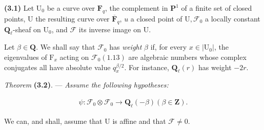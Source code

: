 \documentclass[10pt,leqno]{article}
\begin{document}
\noindent \textbf{(3.1)} Let \(\mathrm{U}_{0}\) be a curve over \(\mathbf{F}_{q}\), the complement in \(\mathbf{P}^{1}\) of a finite set of closed points, \(\mathrm{U}\) the resulting curve over \(\overline{\mathbf{F}}_{q}\), \(u\) a closed point of \(\mathrm{U}, \mathcal{F} _{0}\) a locally constant \(\mathbf{Q}_{\ell }\)-sheaf on \(\mathrm{U}_{0}\), and \(\mathcal{F} \) its inverse image on \(\mathrm{U}\).\par

\clearpage

\label{physical-13}

\noindent Let \(\beta \in \mathbf{Q}\). We shall say that \(\mathcal{F} _{0}\) has \emph{weight} \(\beta \) if, for every \(x\in |\mathrm{U}_{0}|\), the eigenvalues of \(\mathrm{F}_{x}\) acting on \(\mathcal{F} _{0} (1.13)\) are algebraic numbers whose complex conjugates all have absolute value \(q_{x}^{\beta /2}\). For instance, \(\mathbf{Q}_{\ell }(r)\) has weight \(- 2r\).\par

\noindent \emph{Theorem} \textbf{(3.2)}. — {\itshape Assume the following hypotheses:}\par

\par

\begin{equation*}\begin{gathered}\psi  : \mathcal{F} _{0}\otimes \mathcal{F} _{0} \longrightarrow  \mathbf{Q}_{\ell }(- \beta )    (\beta \in \mathbf{Z}).\end{gathered}\end{equation*}

\par

\par

\par

\noindent We can, and shall, assume that \(\mathrm{U}\) is affine and that \(\mathcal{F} \ne 0\).\par
\end{document}
